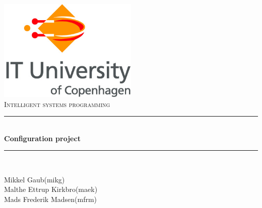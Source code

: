 \begin{titlepage}
\newcommand{\HRule}{\rule{\linewidth}{0.5mm}} %

\center %
 

\includegraphics[width=0.5\textwidth]{logo.jpg}\\[1cm] %

\vspace{2 cm}
\textsc{\large Intelligent systems programming} \\[0.4cm] %
\vspace{1 cm}
\HRule \\[1.0cm]
{ \LARGE \textbf{Configuration project} \small \vspace{0.4cm}}\\ %
\HRule \\[1.0cm]
 
\center
 
\vspace{1.0 cm}

\begin{minipage}{0.4\textwidth}
\begin{centering} 
Mikkel Gaub(mikg)\\
Malthe Ettrup Kirkbro(maek)\\
Mads Frederik Madsen(mfrm)\\
\end{centering}
\end{minipage}
~
\end{titlepage}

